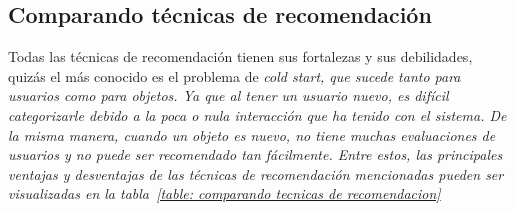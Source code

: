  	\subsection{Comparando técnicas de recomendación}
 		Todas las técnicas de recomendación tienen sus fortalezas y sus debilidades, quizás el más conocido es el problema de \it{cold start}, que sucede tanto para usuarios como para objetos. Ya que al tener un usuario nuevo, es difícil categorizarle debido a la poca o nula interacción que ha tenido con el sistema. De la misma manera, cuando un objeto es nuevo, no tiene muchas evaluaciones de usuarios y no puede ser recomendado tan fácilmente. Entre estos, las principales ventajas y desventajas de las técnicas de recomendación mencionadas pueden ser visualizadas en la tabla~\ref{table: comparando tecnicas de recomendacion}\cite{5}
 		
